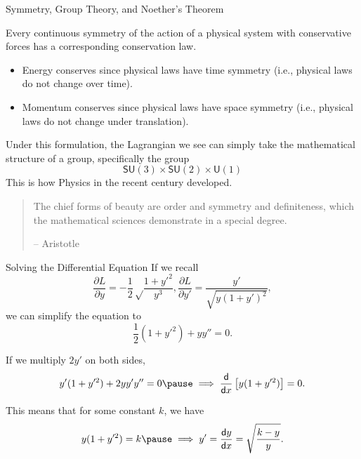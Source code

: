 \documentclass{beamer}
\newcommand{\diff}{\mathsf{d}}
\begin{document}
\begin{frame}{Symmetry, Group Theory, and Noether's Theorem} \pause
    \begin{theorem}
        Every continuous symmetry of the action of a physical system with conservative forces has a corresponding conservation law.
    \end{theorem} \pause

    \begin{examples}
        \begin{itemize}
            \item Energy conserves since physical laws have time symmetry (i.e., physical laws do not change over time). \pause
            \item Momentum conserves since physical laws have space symmetry (i.e., physical laws do not change under translation).
        \end{itemize}
    \end{examples} \pause

    Under this formulation, the Lagrangian we see can simply take the mathematical structure of a group, specifically the group
    \[
        \mathsf{SU}(3) \times \mathsf{SU}(2) \times \mathsf{U}(1)
    \] \pause
    This is how Physics in the recent century developed.
\end{frame}

\begin{frame}
    \begin{quote}
        The chief forms of beauty are order and symmetry and definiteness, which the mathematical sciences demonstrate in a special degree.

        \hfill -- Aristotle
    \end{quote}
\end{frame}

\begin{frame}{Solving the Differential Equation}
    If we recall
    \[
        \frac{\partial L}{\partial y} = - \frac{1}{2} \sqrt\frac{1 + y'^2}{y^3}, \frac{\partial L}{\partial y'} = \frac{y'}{\sqrt{y(1+y')^2}},
    \]
    we can simplify the equation to\pause
    \[
        \frac{1}{2}(1 + y'^2) + y y'' = 0.
    \]
    
    If we multiply \(2y'\) on both sides,
    \[
        y'(1 + y'^2) + 2yy'y'' = 0 \pause \implies \frac{\diff}{\diff x} \left[y (1 + y'^2)\right] = 0.
    \]\pause

    This means that for some constant \(k\), we have
    \[
        y(1 + y'^2) = k \pause \implies y' = \frac{\diff y}{\diff x} = \sqrt\frac{k - y}{y}.
    \]
\end{frame}
\end{document}
